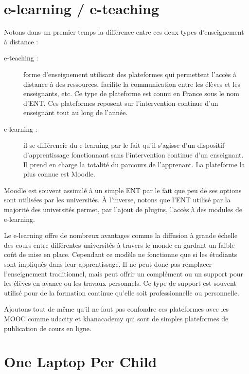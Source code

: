 \section{e-learning / e-teaching}

Notons dans un premier temps la différence entre ces deux types d'enseignement à distance :

\begin{description}
  \item[e-teaching :] forme d'enseignement utilisant des plateformes qui permettent l'accès à distance à des ressources, facilite la communication entre les élèves et les enseignants, etc. Ce type de plateforme est connu en France sous le nom d'\gls{ENT}. Ces plateformes reposent sur l’intervention continue d'un enseignant tout au long de l'année.
  \item[e-learning :] il se différencie du e-learning par le fait qu'il s'agisse d'un dispositif d'apprentissage fonctionnant sans l'intervention continue d'un enseignant. Il prend en charge la totalité du parcours de l'apprenant. La plateforme la plus connue est Moodle\cite{moodle_website}.
\end{description}

Moodle est souvent assimilé à un simple ENT par le fait que peu de ses options sont utilisées par les universités. À l'inverse, notons que l'ENT utilisé par la majorité des universités permet, par l'ajout de plugins, l'accès à des modules de e-learning.

Le e-learning offre de nombreux avantages comme la diffusion à grande échelle des cours entre différentes universités à travers le monde en gardant un faible coût de mise en place. Cependant ce modèle ne fonctionne que si les étudiants sont impliqués dans leur apprentissage. Il ne peut donc pas remplacer l'enseignement traditionnel, mais peut offrir un complément ou un support pour les élèves en avance ou les travaux personnels. Ce type de support est souvent utilisé pour de la formation continue qu'elle soit professionnelle ou personnelle.

Ajoutons tout de même qu'il ne faut pas confondre ces plateformes avec
les \gls{MOOC} comme udacity et khanacademy qui sont de simples
plateformes de publication de cours en ligne.

\section{One Laptop Per Child}

